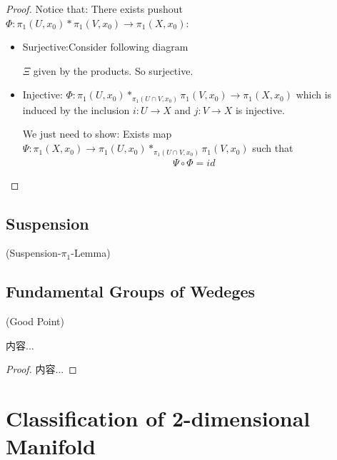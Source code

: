 \documentclass[Total.tex]{subfiles}
\begin{document}
			\begin{proof}
				Notice that: There exists pushout $\Phi:\pi_1(U,x_0)*\pi_1(V,x_0)\rightarrow \pi_1(X,x_0)$:
				\begin{itemize}
					\item Surjective:Consider following diagram
					\begin{center}
					\end{center}
					$\Xi$ given by the products. So surjective.
					\item Injective: $\Phi:\pi_1(U,x_0)*_{\pi_1(U\cap V,x_0)} \pi_1(V,x_0)\rightarrow \pi_1(X,x_0)$ which is induced by the inclusion $i:U\rightarrow X$ and $j:V\rightarrow X$ is injective.
					
					We just need to show: Exists map  $\Psi:\pi_1(X,x_0)\rightarrow \pi_1(U,x_0)*_{\pi_1(U\cap V,x_0)} \pi_1(V,x_0)$ such that 
					\begin{gather*}
						\Psi\circ \Phi=id
					\end{gather*}
				\end{itemize}
			\end{proof}
			\subsection{Suspension}
				\begin{Def}
					
				\end{Def}
				\begin{lemma}
					(Suspension-$\pi_1$-Lemma)
				\end{lemma}
			\subsection{Fundamental Groups of Wedeges}
				\begin{Def}
					(Good Point) 
				\end{Def}
				
				\begin{lemma}
					内容...
				\end{lemma}
				\begin{proof}
					内容...
				\end{proof}
		\section{Classification of 2-dimensional Manifold}
\end{document}
